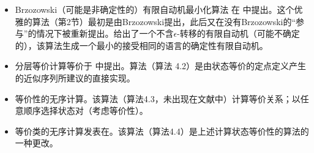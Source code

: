 \begin{itemize}
    \item Brzozowski（可能是非确定性的）有限自动机最小化算法 在 \cite{Brzo62} 中提出。这个优雅的算法（第2节）最初是由Brzozowski提出，此后又在没有Brzozowski的“参与”的情况下被重新提出。给出了一个不含$\epsilon$-转移的有限自动机（可能不确定的），该算法生成一个最小的接受相同的语言的确定性有限自动机。

    \item 分层等价计算等价于 \cite{Wood87, Moor56, Brau88, Urba89} 中提出。算法（算法 4.2）是由状态等价的定点定义产生的近似序列所建议的直接实现。

    \item 等价性的无序计算。该算法（算法4.3，未出现在文献中）计算等价关系；以任意顺序选择状态对（考虑等价性）。

    \item 等价类的无序计算发表在\cite{ASU86}。该算法（算法4.4）是上述计算状态等价性的算法的一种更改。

\end{itemize}

